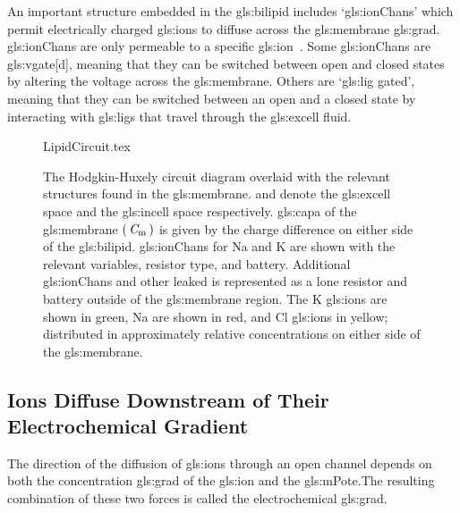 \documentclass[class={myRUCProject}, crop=false]{standalone}
\begin{document}
An important structure embedded in the \gls{gls:bilipid} includes `\glspl{gls:ionChan}' which permit electrically charged \glspl{gls:ion} to diffuse across the \gls{gls:membrane} \gls{gls:grad}. \Glspl{gls:ionChan} are only permeable to a specific \gls{gls:ion}~\cite{Hammond2015ch4}. Some \glspl{gls:ionChan} are \gls{gls:vgate}[d], meaning that they can be switched between open and closed states by altering the voltage across the \gls{gls:membrane}. 
Others are `\gls{gls:lig} gated', meaning that they can be switched between an open and a closed state by interacting with \glspl{gls:lig} that travel through the \gls{gls:excell} fluid. 

\vspace{1em}

\begin{figure}[H]
    \centering
    {LipidCircuit.tex}
    \caption{The Hodgkin-Huxely circuit diagram overlaid with the relevant structures found in the \gls{gls:membrane}.  and  denote the \gls{gls:excell} space and the \gls{gls:incell} space respectively. \Gls{gls:capa} of the \gls{gls:membrane} \(\left(\,\mathit{C}_\mathrm{m}\,\right)\) is given by the charge difference on either side of the \gls{gls:bilipid}. \Glspl{gls:ionChan} for \gls{Na} and \gls{K} are shown with the relevant variables, resistor type, and battery. Additional \glspl{gls:ionChan} and other leaked is represented as a lone resistor and battery outside of the \gls{gls:membrane} region. The \gls{K} \glspl{gls:ion} are shown in green, \gls{Na} are shown in red, and \gls{Cl} \glspl{gls:ion} in yellow; distributed in approximately relative concentrations on either side of the \gls{gls:membrane}. }\label{fig:MembraneCircut}
\end{figure}


\subsection{Ions Diffuse Downstream of Their Electrochemical Gradient}


The direction of the diffusion of \glspl{gls:ion} through an open channel depends on both the concentration \gls{gls:grad} of the \gls{gls:ion} and the \gls{gls:mPote}.The resulting combination of these two forces is called the electrochemical \gls{gls:grad}.
\end{document}
